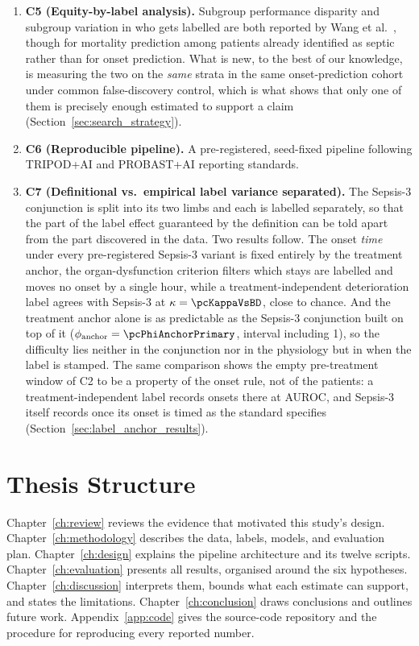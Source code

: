 \begin{enumerate}
    \item \textbf{C5 (Equity-by-label analysis).} Subgroup performance
    disparity and subgroup variation in who gets labelled are both reported by
    Wang et al.\ \cite{wang2022equity}, though for mortality prediction among
    patients already identified as septic rather than for onset prediction.
    What is new, to the best of our knowledge, is measuring the two on the
    \emph{same} strata in the same onset-prediction cohort under common
    false-discovery control, which is what shows that only one of them is
    precisely enough estimated to support a claim
    (Section~\ref{sec:search_strategy}).

    \item \textbf{C6 (Reproducible pipeline).} A pre-registered, seed-fixed
    pipeline following TRIPOD+AI \cite{collins2024tripodai} and PROBAST+AI
    \cite{moons2025probastai} reporting standards.

    \item \textbf{C7 (Definitional vs.\ empirical label variance separated).}
    The Sepsis-3 conjunction is split into its two limbs and each is labelled
    separately, so that the part of the label effect guaranteed by the
    definition can be told apart from the part discovered in the data. Two
    results follow. The onset \emph{time} under every pre-registered Sepsis-3
    variant is fixed entirely by the treatment anchor, the organ-dysfunction
    criterion filters which stays are labelled and moves no onset by a single
    hour, while a treatment-independent deterioration label agrees with
    Sepsis-3 at $\kappa = \pcKappaVsBD$, close to chance. And the treatment
    anchor alone is as predictable as the Sepsis-3 conjunction built on top of
    it ($\phi_{\text{anchor}} = \pcPhiAnchorPrimary$, interval including 1), so
    the difficulty lies neither in the conjunction nor in the physiology but in
    when the label is stamped. The same
    comparison shows the empty pre-treatment window of C2 to be a property of
    the onset rule, not of the patients: a treatment-independent label records
    \pcPreTreatOnsetsVarD{} onsets there at \pcPreTreatAurocPrimaryD{} AUROC,
    and Sepsis-3 itself records \pcPreTreatOnsetsVarF{} once its onset is timed
    as the standard specifies (Section~\ref{sec:label_anchor_results}).
\end{enumerate}


\section{Thesis Structure}

Chapter~\ref{ch:review} reviews the evidence that motivated this study's design.
Chapter~\ref{ch:methodology} describes the data, labels, models, and evaluation
plan.
Chapter~\ref{ch:design} explains the pipeline architecture and its twelve
scripts.
Chapter~\ref{ch:evaluation} presents all results, organised around the six
hypotheses.
Chapter~\ref{ch:discussion} interprets them, bounds what each estimate can
support, and states the limitations.
Chapter~\ref{ch:conclusion} draws conclusions and outlines future work.
Appendix~\ref{app:code} gives the source-code repository and the procedure for
reproducing every reported number.

